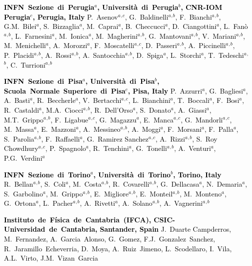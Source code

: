 \textcolor{black}{\textbf{INFN~Sezione~di~Perugia$^{a}$, Universit\`{a}~di~Perugia$^{b}$, CNR-IOM Perugia$^{c}$, Perugia, Italy}\newline
P.~Asenov$^{a}$$^{,}$$^{c}$, G.~Baldinelli$^{a}$$^{,}$$^{b}$, F.~Bianchi$^{a}$$^{,}$$^{b}$, G.M.~Bilei$^{a}$, S.~Bizzaglia$^{a}$, M.~Caprai$^{a}$, B.~Checcucci$^{a}$, D.~Ciangottini$^{a}$, L.~Fan\`{o}$^{a}$$^{,}$$^{b}$, L.~Farnesini$^{a}$, M.~Ionica$^{a}$, M.~Magherini$^{a}$$^{,}$$^{b}$, G.~Mantovani$^{a}$$^{,}$$^{b}$, V.~Mariani$^{a}$$^{,}$$^{b}$, M.~Menichelli$^{a}$, A.~Morozzi$^{a}$, F.~Moscatelli$^{a}$$^{,}$$^{c}$, D.~Passeri$^{a}$$^{,}$$^{b}$, A.~Piccinelli$^{a}$$^{,}$$^{b}$, P.~Placidi$^{a}$$^{,}$$^{b}$, A.~Rossi$^{a}$$^{,}$$^{b}$, A.~Santocchia$^{a}$$^{,}$$^{b}$, D.~Spiga$^{a}$, L.~Storchi$^{a}$, T.~Tedeschi$^{a}$$^{,}$$^{b}$, C.~Turrioni$^{a}$$^{,}$$^{b}$}

\textcolor{black}{\textbf{INFN~Sezione~di~Pisa$^{a}$, Universit\`{a}~di~Pisa$^{b}$, Scuola~Normale~Superiore~di~Pisa$^{c}$, Pisa, Italy}\newline
P.~Azzurri$^{a}$, G.~Bagliesi$^{a}$, A.~Basti$^{a}$, R.~Beccherle$^{a}$, V.~Bertacchi$^{a}$$^{,}$$^{c}$, L.~Bianchini$^{a}$, T.~Boccali$^{a}$, F.~Bosi$^{a}$, R.~Castaldi$^{a}$, M.A.~Ciocci$^{a}$$^{,}$$^{b}$, R.~Dell'Orso$^{a}$, S.~Donato$^{a}$, A.~Giassi$^{a}$, M.T.~Grippo$^{a}$$^{,}$$^{b}$, F.~Ligabue$^{a}$$^{,}$$^{c}$, G.~Magazzu$^{a}$, E.~Manca$^{a}$$^{,}$$^{c}$, G.~Mandorli$^{a}$$^{,}$$^{c}$, M.~Massa$^{a}$, E.~Mazzoni$^{a}$, A.~Messineo$^{a}$$^{,}$$^{b}$, A.~Moggi$^{a}$, F.~Morsani$^{a}$, F.~Palla$^{a}$, S.~Parolia$^{a}$$^{,}$$^{b}$, F.~Raffaelli$^{a}$, G.~Ramirez Sanchez$^{a}$$^{,}$$^{c}$, A.~Rizzi$^{a}$$^{,}$$^{b}$, S.~Roy Chowdhury$^{a}$$^{,}$$^{c}$, P.~Spagnolo$^{a}$, R.~Tenchini$^{a}$, G.~Tonelli$^{a}$$^{,}$$^{b}$, A.~Venturi$^{a}$, P.G.~Verdini$^{a}$}

\textcolor{black}{\textbf{INFN~Sezione~di~Torino$^{a}$, Universit\`{a}~di~Torino$^{b}$, Torino, Italy}\newline
R.~Bellan$^{a}$$^{,}$$^{b}$, S.~Coli$^{a}$, M.~Costa$^{a}$$^{,}$$^{b}$, R.~Covarelli$^{a}$$^{,}$$^{b}$, G.~Dellacasa$^{a}$, N.~Demaria$^{a}$, S.~Garbolino$^{a}$, M.~Grippo$^{a}$$^{,}$$^{b}$, E.~Migliore$^{a}$$^{,}$$^{b}$, E.~Monteil$^{a}$$^{,}$$^{b}$, M.~Monteno$^{a}$, G.~Ortona$^{a}$, L.~Pacher$^{a}$$^{,}$$^{b}$, A.~Rivetti$^{a}$, A.~Solano$^{a}$$^{,}$$^{b}$, A.~Vagnerini$^{a}$$^{,}$$^{b}$}

\textcolor{black}{\textbf{Instituto~de~F\'{i}sica~de~Cantabria~(IFCA), CSIC-Universidad~de~Cantabria, Santander, Spain}\newline
J.~Duarte Campderros, M.~Fernandez, A.~Garcia~Alonso, G.~Gomez, F.J.~Gonzalez~Sanchez, R.~Jaramillo~Echeverria, D.~Moya, A.~Ruiz~Jimeno, L.~Scodellaro, I.~Vila, A.L.~Virto, J.M.~Vizan~Garcia}

